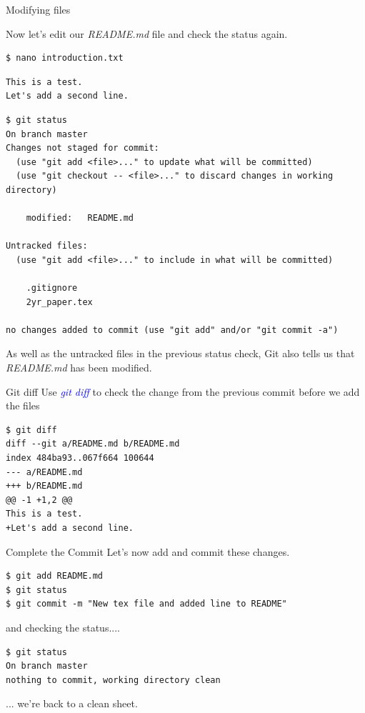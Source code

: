 \documentclass[11pt]{beamer}
\begin{document}
\begin{frame}[fragile]{Modifying files}

Now let's edit our \emph{README.md} file and check the status again.
\begin{lstlisting}
$ nano introduction.txt
\end{lstlisting}
\begin{lstlisting}
This is a test.
Let's add a second line.
\end{lstlisting}
\begin{lstlisting}
$ git status
On branch master
Changes not staged for commit:
  (use "git add <file>..." to update what will be committed)
  (use "git checkout -- <file>..." to discard changes in working directory)

    modified:   README.md

Untracked files:
  (use "git add <file>..." to include in what will be committed)

    .gitignore
    2yr_paper.tex

no changes added to commit (use "git add" and/or "git commit -a")
\end{lstlisting}
As well as the untracked files in the previous status check, Git also tells us that \emph{README.md} has been modified.
\end{frame}


\begin{frame}[fragile]{Git diff}
Use \textcolor{blue}{\emph{git diff}} to check the change from the previous commit before we add the files
\begin{lstlisting}
$ git diff
diff --git a/README.md b/README.md
index 484ba93..067f664 100644
--- a/README.md
+++ b/README.md
@@ -1 +1,2 @@
This is a test.
+Let's add a second line.
\end{lstlisting}
\end{frame}
\begin{frame}[fragile]{Complete the Commit}
 Let's now add and commit these changes.
\begin{lstlisting}
$ git add README.md
$ git status
$ git commit -m "New tex file and added line to README"
\end{lstlisting}
and checking the status....
\begin{lstlisting}
$ git status
On branch master
nothing to commit, working directory clean
\end{lstlisting}
... we're back to a clean sheet.
\end{frame}
\end{document}
